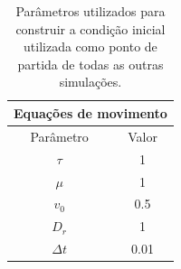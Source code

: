 \documentclass{article}
\theoremstyle{definition}
\begin{document}
\begin{table}[h]
\begin{subtable}[t]{0.48\textwidth}
\begin{subtable}[t]{\textwidth}
\begin{tabular}[t]{||c|c||}
                 \multicolumn{2}{|c|}{\textbf{Equações de movimento}} \\
                 \hline
                 Parâmetro & Valor \\
                 \hline \hline
                 $\tau$ & 1 \\ \hline
                $\mu$ & 1 \\ \hline
                $v_0$ & 0.5 \\ \hline
                $D_r$ & 1 \\ \hline
                $\Delta t$ & 0.01 \\ \hline
            \end{tabular}
            \label{tab:init_cond_pars_eq_motion}
        \end{subtable}
    \end{subtable}
    \caption{Parâmetros utilizados para construir a condição inicial utilizada como ponto de partida de todas as outras simulações.}
    \label{tab:init_cond_pars}
\end{table}

\end{document}
